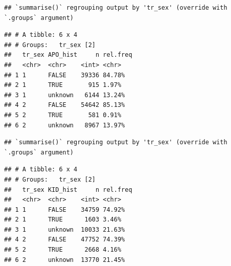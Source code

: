 \documentclass[
]{article}
\newenvironment{Shaded}{\begin{snugshade}}{\end{snugshade}}
\newcommand{\DataTypeTok}[1]{\textcolor[rgb]{0.13,0.29,0.53}{#1}}
\newcommand{\DecValTok}[1]{\textcolor[rgb]{0.00,0.00,0.81}{#1}}
\newcommand{\KeywordTok}[1]{\textcolor[rgb]{0.13,0.29,0.53}{\textbf{#1}}}
\newcommand{\NormalTok}[1]{#1}
\newcommand{\OperatorTok}[1]{\textcolor[rgb]{0.81,0.36,0.00}{\textbf{#1}}}
\newcommand{\OtherTok}[1]{\textcolor[rgb]{0.56,0.35,0.01}{#1}}
\newcommand{\StringTok}[1]{\textcolor[rgb]{0.31,0.60,0.02}{#1}}
\begin{document}
\begin{verbatim}
## `summarise()` regrouping output by 'tr_sex' (override with `.groups` argument)
\end{verbatim}

\begin{verbatim}
## # A tibble: 6 x 4
## # Groups:   tr_sex [2]
##   tr_sex APO_hist     n rel.freq
##   <chr>  <chr>    <int> <chr>   
## 1 1      FALSE    39336 84.78%  
## 2 1      TRUE       915 1.97%   
## 3 1      unknown   6144 13.24%  
## 4 2      FALSE    54642 85.13%  
## 5 2      TRUE       581 0.91%   
## 6 2      unknown   8967 13.97%
\end{verbatim}

\begin{Shaded}
\end{Shaded}

\begin{verbatim}
## `summarise()` regrouping output by 'tr_sex' (override with `.groups` argument)
\end{verbatim}

\begin{verbatim}
## # A tibble: 6 x 4
## # Groups:   tr_sex [2]
##   tr_sex KID_hist     n rel.freq
##   <chr>  <chr>    <int> <chr>   
## 1 1      FALSE    34759 74.92%  
## 2 1      TRUE      1603 3.46%   
## 3 1      unknown  10033 21.63%  
## 4 2      FALSE    47752 74.39%  
## 5 2      TRUE      2668 4.16%   
## 6 2      unknown  13770 21.45%
\end{verbatim}

\begin{Shaded}
\end{Shaded}
\end{document}
